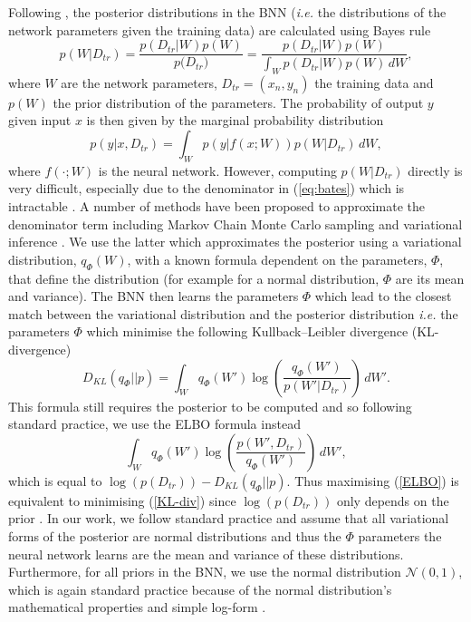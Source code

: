 \documentclass[a4paper]{article}
\begin{document}
Following \cite{jospin2020hands}, the posterior distributions in the BNN (\textit{i.e.} the distributions of the network parameters given the training data) are calculated using Bayes rule
\begin{equation}\label{eq:bates}
    p\left(W\lvert D_{tr}\right) = \frac{p(D_{tr}\lvert W)p(W)}{p({D_{tr})}} = \frac{p(D_{tr}\lvert W)p(W)}{\int_{W} p(D_{tr}\lvert W)p(W)\,dW},
\end{equation}
where $W$ are the network parameters, $D_{tr} = \left(x_{n}, y_{n}\right)$ the training data and $p(W)$ the prior distribution of the parameters. The probability of output $y$ given input $x$ is then given by the marginal probability distribution
\begin{equation}
    p(y\lvert x, D_{tr}) = \int_{W} p(y\rvert f(x; W))p(W\rvert D_{tr})\, dW,
\end{equation}
where $f(\cdot; W)$ is the neural network. However, computing $p\left(W\lvert D_{tr}\right)$ directly is very difficult, especially due to the denominator in (\ref{eq:bates}) which is intractable \citep{jospin2020hands, Bykov2020}. A number of methods have been proposed to approximate the denominator term including Markov Chain Monte Carlo sampling \citep{titterington2004bayesian} and variational inference \citep{osawa2019practical}. We use the latter which approximates the posterior using a variational distribution, $q_{\Phi}(W)$, with a known formula dependent on the parameters, $\Phi$, that define the distribution (for example for a normal distribution, $\Phi$ are its mean and variance). The BNN then learns the parameters $\Phi$ which lead to the closest match between the variational distribution and the posterior distribution \textit{i.e.} the parameters $\Phi$ which minimise the following Kullback–Leibler divergence (KL-divergence) 
\begin{equation}\label{KL-div}
    D_{KL}(q_{\Phi}\rvert\rvert p) = \int_{W} q_{\Phi}(W')\log\left(\frac{q_{\Phi}(W')}{p\left(W'\lvert D_{tr}\right)}\right)\,dW'.
\end{equation}
This formula still requires the posterior to be computed and so following standard practice, we use the ELBO formula instead
\begin{equation}\label{ELBO}
\int_{W} q_{\Phi}(W')\log\left(\frac{p(W', D_{tr})}{q_{\Phi}(W')}\right)\,dW',
\end{equation}
which is equal to $\log(p(D_{tr})) - D_{KL}(q_{\Phi}\rvert\rvert p)$. Thus maximising (\ref{ELBO}) is equivalent to minimising (\ref{KL-div}) since $\log(p(D_{tr}))$ only depends on the prior \citep{jospin2020hands}. In our work, we follow standard practice and assume that all variational forms of the posterior are normal distributions and thus the $\Phi$ parameters the neural network learns are the mean and variance of these distributions. Furthermore, for all priors in the BNN, we use the normal distribution $\mathcal{N}(0, 1)$, which is again standard practice because of the normal distribution's mathematical properties and simple log-form \citep{silvestro2020prior}. 
\end{document}
